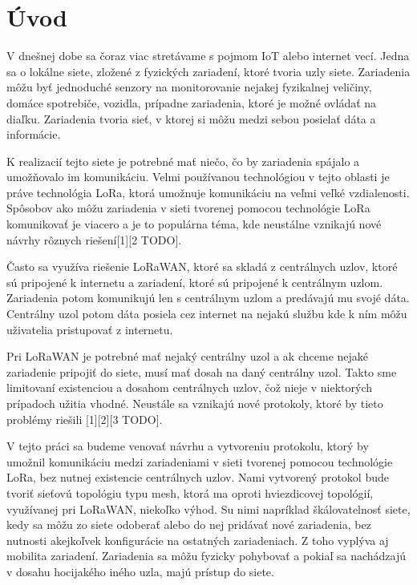 \documentclass[slovak,master]{diploma}
\begin{document}
\MakeTitlePages

\listoffigures
\clearpage

\listoftables
\clearpage

\chapter{Úvod} %
V dnešnej dobe sa čoraz viac stretávame s pojmom IoT alebo internet vecí. Jedna sa o lokálne siete, zložené z fyzických zariadení, ktoré tvoria uzly siete.
Zariadenia môžu byť jednoduché senzory na monitorovanie nejakej fyzikalnej veličiny, domáce spotrebiče, vozidla, prípadne 
zariadenia, ktoré je možné ovládať na diaľku. Zariadenia tvoria sieť, v ktorej si môžu medzi sebou posielať 
dáta a informácie.

K realizacií tejto siete je potrebné mať niečo, čo by zariadenia spájalo a umožňovalo im komunikáciu. Velmi používanou technológiou
v tejto oblasti je práve technológia LoRa, ktorá umožnuje komunikáciu na veľmi veľké vzdialenosti. Spôsobov ako môžu zariadenia 
v sieti tvorenej pomocou technológie LoRa komunikovať je viacero a je to populárna téma, kde neustálne vznikajú nové návrhy rôznych riešení[1][2 TODO]. %

Často sa využíva riešenie LoRaWAN, ktoré sa skladá z centrálnych uzlov, ktoré sú pripojené k internetu a zariadení, ktoré sú pripojené k centrálnym uzlom. 
Zariadenia potom komunikujú len s centrálnym uzlom a predávajú mu svojé dáta. Centrálny uzol potom dáta posiela cez internet na nejakú službu kde 
k ním môžu uživatelia pristupovať z internetu.

Pri LoRaWAN je potrebné mať nejaký centrálny uzol a ak chceme nejaké zariadenie pripojiť do siete, musí mať dosah na daný centrálny uzol. 
Takto sme limitovaní existenciou a dosahom centrálnych uzlov, čož nieje v niektorých prípadoch užitia vhodné. Neustále sa vznikajú nové 
protokoly, ktoré by tieto problémy riešili [1][2][3 TODO]. %

V tejto práci sa budeme venovať návrhu a vytvoreniu protokolu, ktorý by umožnil komunikáciu medzi zariadeniami v sieti tvorenej pomocou technológie LoRa,
bez nutnej existencie centrálnych uzlov. Nami vytvorený protokol bude tvoriť sieťovú topológiu typu mesh, ktorá ma oproti hviezdicovej topológií, 
využívanej pri LoRaWAN, niekoľko výhod. Su nimi napríklad škálovatelnosť siete, kedy sa môžu zo siete odoberať alebo do nej pridávať nové zariadenia, 
bez nutnosti akejkoľvek konfigurácie na ostatných zariadeniach. Z toho vyplýva aj mobilita zariadení. Zariadenia sa môžu fyzicky pohybovať a 
pokiaľ sa nachádzajú v dosahu hocijakého iného uzla, majú prístup do siete.
\end{document}
